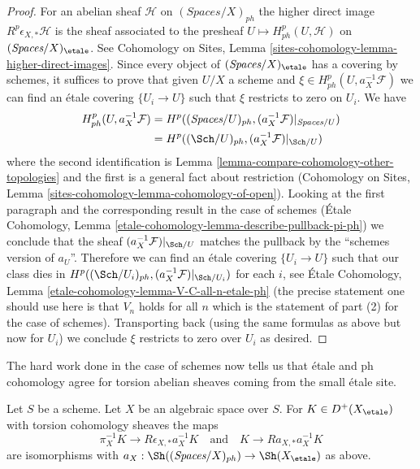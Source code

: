 \begin{proof}
\medskip\noindent
For an abelian sheaf $\mathcal{H}$ on $(\textit{Spaces}/X)_{ph}$ the
higher direct image $R^p\epsilon_{X, *}\mathcal{H}$ is the sheaf
associated to the presheaf $U \mapsto H^p_{ph}(U, \mathcal{H})$
on $(\textit{Spaces}/X)_\etale$. See
Cohomology on Sites, Lemma \ref{sites-cohomology-lemma-higher-direct-images}.
Since every object of $(\textit{Spaces}/X)_\etale$ has a covering
by schemes, it suffices to prove that given $U/X$ a scheme and
$\xi \in H^p_{ph}(U, a_X^{-1}\mathcal{F})$ we can find
an \'etale covering $\{U_i \to U\}$ such that $\xi$
restricts to zero on $U_i$. We have
\begin{align*}
H^p_{ph}(U, a_X^{-1}\mathcal{F})
& =
H^p((\textit{Spaces}/U)_{ph}, (a_X^{-1}\mathcal{F})|_{\textit{Spaces}/U}) \\
& =
H^p((\Sch/U)_{ph}, (a_X^{-1}\mathcal{F})|_{\Sch/U})
\end{align*}
where the second identification is
Lemma \ref{lemma-compare-cohomology-other-topologies}
and the first is a general fact about restriction
(Cohomology on Sites, Lemma \ref{sites-cohomology-lemma-cohomology-of-open}).
Looking at the first paragraph and the corresponding result in the
case of schemes (\'Etale Cohomology, Lemma
\ref{etale-cohomology-lemma-describe-pullback-pi-ph})
we conclude that the sheaf $(a_X^{-1}\mathcal{F})|_{\Sch/U}$
matches the pullback by the ``schemes version of $a_U$''.
Therefore we can find an \'etale covering
$\{U_i \to U\}$ such that our class dies in
$H^p((\Sch/U_i)_{ph}, (a_X^{-1}\mathcal{F})|_{\Sch/U_i})$
for each $i$, see
\'Etale Cohomology, Lemma \ref{etale-cohomology-lemma-V-C-all-n-etale-ph}
(the precise statement one should use here is that $V_n$ holds for all $n$
which is the statement of part (2) for the case of schemes).
Transporting back (using the same formulas as above but now for
$U_i$) we conclude $\xi$ restricts to zero over $U_i$ as desired.
\end{proof}

\noindent
The hard work done in the case of schemes now tells us that
\'etale and ph cohomology agree for torsion abelian sheaves coming from the
small \'etale site.

\begin{lemma}
\label{lemma-cohomological-descent-etale-ph}
Let $S$ be a scheme. Let $X$ be an algebraic space over $S$.
For $K \in D^+(X_\etale)$ with torsion cohomology sheaves the maps
$$
\pi_X^{-1}K \longrightarrow R\epsilon_{X, *}a_X^{-1}K
\quad\text{and}\quad
K \longrightarrow Ra_{X, *}a_X^{-1}K
$$
are isomorphisms with
$a_X : \Sh((\textit{Spaces}/X)_{ph}) \to \Sh(X_\etale)$ as above.
\end{lemma}

